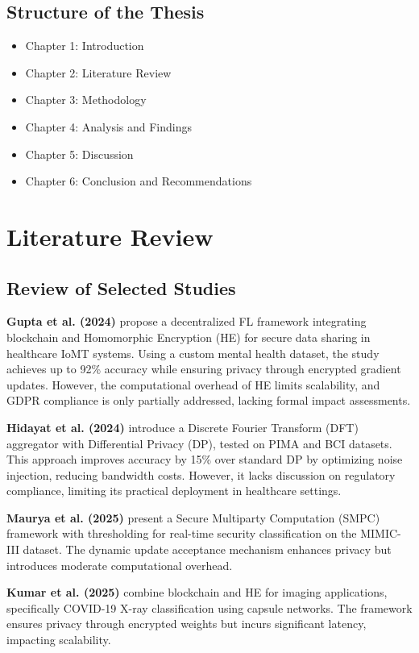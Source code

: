 \documentclass[12pt]{report}
\begin{document}
\section{Structure of the Thesis}
\begin{itemize}
    \item Chapter 1: Introduction
    \item Chapter 2: Literature Review
    \item Chapter 3: Methodology
    \item Chapter 4: Analysis and Findings
    \item Chapter 5: Discussion
    \item Chapter 6: Conclusion and Recommendations
\end{itemize}

\chapter{Literature Review}

\section{Review of Selected Studies}
\textbf{Gupta et al. (2024)} \cite{gupta2024} propose a decentralized FL framework integrating blockchain and Homomorphic Encryption (HE) for secure data sharing in healthcare IoMT systems. Using a custom mental health dataset, the study achieves up to 92\% accuracy while ensuring privacy through encrypted gradient updates. However, the computational overhead of HE limits scalability, and GDPR compliance is only partially addressed, lacking formal impact assessments.

\textbf{Hidayat et al. (2024)} \cite{hidayat2024} introduce a Discrete Fourier Transform (DFT) aggregator with Differential Privacy (DP), tested on PIMA and BCI datasets. This approach improves accuracy by 15\% over standard DP by optimizing noise injection, reducing bandwidth costs. However, it lacks discussion on regulatory compliance, limiting its practical deployment in healthcare settings.

\textbf{Maurya et al. (2025)} \cite{maurya2025} present a Secure Multiparty Computation (SMPC) framework with thresholding for real-time security classification on the MIMIC-III dataset. The dynamic update acceptance mechanism enhances privacy but introduces moderate computational overhead.

\textbf{Kumar et al. (2025)} \cite{kumar2025} combine blockchain and HE for imaging applications, specifically COVID-19 X-ray classification using capsule networks. The framework ensures privacy through encrypted weights but incurs significant latency, impacting scalability.
\end{document}
